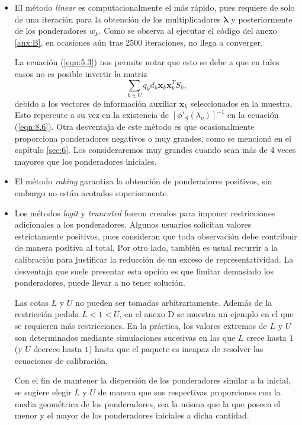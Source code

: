 \documentclass[a4paper,twoside,openright,12pt]{book}
\theoremstyle{definition}
\newcommand\pref[1]{(\ref{#1})}
\numberwithin{equation}{chapter}
\numberwithin{figure}{chapter}
\numberwithin{table}{chapter}
\numberwithin{theorem}{chapter}
\numberwithin{lemma}{chapter}
\begin{document}
\begin{itemize}
	\item El método \textsl{linear} es computacionalmente el más rápido, pues requiere de solo de una iteración para la obtención de los multiplicadores $\mathbf{\lambda}$ y posteriormente de los ponderadores $w_k$. Como se observa al ejecutar el código del anexo \ref{anx:B}, en ocasiones aún tras $2500$ iteraciones, no llega a converger.
	
La ecuación \pref{eqn:5.3} nos permite notar que esto se debe a que en tales casos no es posible invertir la matriz
	$$\sum_{k\in U}q_k d_k \mathbf{x}_k \mathbf{x}_k^T S_k,$$
debido a los vectores de información auxiliar $\mathbf{x}_k$ seleccionados en la muestra. Esto repercute a su vez en la existencia de $[\phi'_S (\lambda_\nu)]^{-1}$ en la ecuación \pref{eqn:8.6}.
Otra desventaja de este método es que ocasionalmente proporciona ponderadores negativos o muy grandes, como se mencionó en el capítulo \ref{sec:6}. Los consideraremos muy grandes cuando sean más de 4 veces mayores que los ponderadores iniciales.
	\item El método \textsl{raking} garantiza la obtención de ponderadores positivos, sin embargo no están acotados superiormente.
	\item Los métodos \textsl{logit} y \textsl{truncated} fueron creados para imponer restricciones adicionales a los ponderadores. Algunos usuarios solicitan valores estrictamente positivos, pues consideran que toda observación debe contribuir de manera positiva al total. Por otro lado, también es usual recurrir a la calibración para justificar la reducción de un exceso de representatividad. La desventaja que suele presentar esta opción es que limitar demasiado los ponderadores, puede llevar a no tener solución.
	
Las cotas $L$ y $U$ no pueden ser tomadas arbitrariamente. Además de la restricción pedida $L<1<U$, en el anexo D se muestra un ejemplo en el que se requieren más restricciones. %
En la práctica, los valores extremos de $ L$ y $U$ son determinados mediante simulaciones sucesivas en las que $L$ crece hasta $1$ (y $U$ decrece hasta $1$) hasta que el paquete es incapaz de resolver las ecuaciones de calibración.

Con el fin de mantener la dispersión de los ponderadores similar a la inicial, se sugiere elegir $L$ y $U$ de manera que sus respectivas proporciones con la media geométrica de los ponderadores, sea la misma que la que poseen el menor y el mayor de los ponderadores iniciales a dicha cantidad.
\end{itemize}
\end{document}
